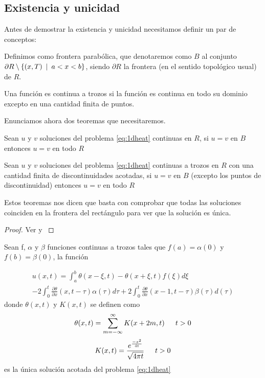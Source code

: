 \subsection{Existencia y unicidad}

Antes de demostrar la existencia y unicidad necesitamos definir un par de conceptos:
\begin{definicion}
	Definimos como frontera parabólica, que denotaremos como $B$ al conjunto $\partial R \setminus \{(x,T)\hspace{5px} | \hspace{5px} a < x < b\}$, siendo $\partial R$ la frontera (en el sentido topológico usual) de $R$.
\end{definicion}
\begin{definicion}
	Una función es continua a trozos si la función es continua en todo su dominio excepto en una cantidad finita de puntos.
\end{definicion}

Enunciamos ahora dos teoremas que necesitaremos.


\begin{teorema}[Unicidad]
	Sean $u$ y $v$ soluciones del problema \eqref{eq:1dheat} continuas en $R$, si $u=v$ en $B$ entonces $u=v$ en todo $R$
\end{teorema}

\begin{teorema}
	Sean $u$ y $v$ soluciones del problema \eqref{eq:1dheat} continuas a trozos en $R$ con una cantidad finita de discontinuidades acotadas, si $u=v$ en $B$ (excepto los puntos de discontinuidad) entonces $u=v$ en todo $R$
\end{teorema}

Estos teoremas nos dicen que basta con comprobar que todas las soluciones coinciden en la frontera del rectángulo para ver que la solución es única.

\begin{proof}
	Ver \cite[Th. 1.6.4]{1dheat} y \cite[Th. 1.6.6]{1dheat}
\end{proof}


\begin{teorema}\label{teo:exis_uni_1dheat}
	Sean f, $\alpha$ y $\beta$ funciones continuas a trozos tales que $f(a)=\alpha(0)$ y $f(b)=\beta(0)$, la función
	
	\begin{multline}\label{eq:sol1dheat}
		u(x,t) = \int_{a}^{b}\theta(x-\xi,t)-\theta(x+\xi,t)f(\xi)d\xi \\
		- 2\int_{0}^{t}\frac{\partial \theta}{\partial x}(x, t-\tau)\alpha(\tau)d\tau+2\int_{0}^{t}\frac{\partial\theta}{\partial x}(x-1,t-\tau)\beta(\tau)d(\tau)
	\end{multline}
	donde $\theta(x,t)$ y $K(x,t)$ se definen como
	\[
		\theta(x,t)=\sum_{m=-\infty}^{\infty}K(x+2m,t) \hspace{15px} t>0
	\]\[
		K(x,t)=\frac{e^{\frac{-x^2}{4t}}}{\sqrt{4\pi t}}\hspace{15px} t>0
	\]
	es la única solución acotada del problema \ref{eq:1dheat}
	
\end{teorema}

